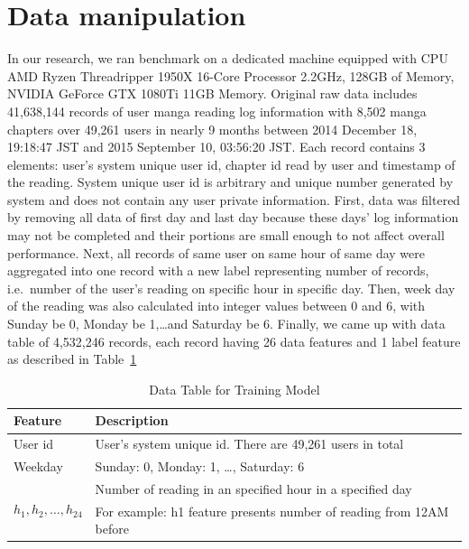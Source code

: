 \documentclass[English]{dicomopapers}
\begin{document}
\section{Data manipulation}
In our research, we ran benchmark on a dedicated machine equipped with CPU AMD Ryzen Threadripper 1950X 16-Core Processor 2.2GHz, 128GB of Memory, NVIDIA GeForce GTX 1080Ti 11GB Memory\@. Original raw data includes 41,638,144 records of user manga reading log information with 8,502 manga chapters over 49,261 users in nearly 9 months between 2014 December 18, 19:18:47 JST and 2015 September 10, 03:56:20 JST\@. Each record contains 3 elements: user's system unique user id, chapter id read by user and timestamp of the reading. System unique user id is arbitrary and unique number generated by system and does not contain any user private information.\newline
First, data was filtered by removing all data of first day and last day because these days' log information may not be completed and their portions are small enough to not affect overall performance. Next, all records of same user on same hour of same day were aggregated into one record with a new label representing number of records, i.e.\ number of the user's reading on specific hour in specific day. Then, week day of the reading was also calculated into integer values between 0 and 6, with Sunday be 0, Monday be 1,\ldots and Saturday be 6. Finally, we came up with data table of 4,532,246 records, each record having 26 data features and 1 label feature as described in Table~\ref{table:db_description}\newline
\begin{center}
  \begin{table}
    \caption{Data Table for Training Model}\label{table:db_description}
    \begin{tabular}{|p{}|p{}|}
      \toprule
      \textbf{Feature} & \textbf{Description} \\
      \midrule
      {User id} & {User's system unique id. There are 49,261 users in total} \\
      \midrule
      {Weekday} & {Sunday: 0, Monday: 1, \ldots, Saturday: 6} \\
      \midrule
      \multirow{2}{*}{\(h_1, h_2, \ldots, h_{24}\)} & {Number of reading in an specified hour in a specified day} \\
      & {For example: h1 feature presents number of reading from 12AM before}\\
      \bottomrule
    \end{tabular}
    \newline
  \end{table}
\end{center}
\end{document}

